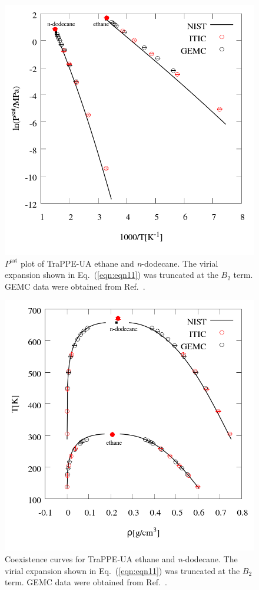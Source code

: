 \documentclass[5p,times]{elsarticle}
\begin{document}
\begin{figure}
\includegraphics[scale=0.30]{Figures/EXAMPLE-SIM_TraPPE-C2_C12_psat.png}
\caption{$P^{\mathrm{sat}}$ plot of TraPPE-UA ethane and \textit{n}-dodecane. The virial expansion shown in Eq.~(\ref{eqn:eqn11}) was truncated at the $B_2$ term. GEMC data were obtained from Ref.~\cite{Martin1998}.}
\label{fig:EXAMPLE-SIM/TraPPE-C2-C12/Psat}
\end{figure}

\begin{figure}
\includegraphics[scale=0.30]{Figures/EXAMPLE-SIM_TraPPE-C2_C12_trho.png}
\caption{Coexistence curves for TraPPE-UA ethane and \textit{n}-dodecane. The virial expansion shown in Eq.~(\ref{eqn:eqn11}) was truncated at the $B_2$ term. GEMC data were obtained from Ref.~\cite{Martin1998}.}
\label{fig:EXAMPLE-SIM/TraPPE-C2-C12/T_rho}
\end{figure}
\end{document}
